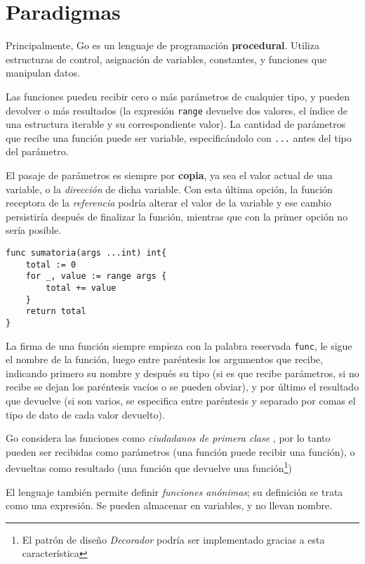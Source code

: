 \section{Paradigmas}

Principalmente, Go es un lenguaje de programación \textbf{procedural}. Utiliza estructuras de control, asignación de variables, constantes, y funciones que manipulan datos.

Las funciones pueden recibir cero o más parámetros de cualquier tipo, y pueden devolver o más resultados (la expresión \texttt{range} devuelve dos valores, el índice de una estructura iterable y su correspondiente valor). La cantidad de parámetros que recibe una función puede ser variable, especificándolo con \texttt{...} antes del tipo del parámetro.

El pasaje de parámetros es siempre por \textbf{copia}, ya sea el valor actual de una variable, o la \emph{dirección} de dicha variable. Con esta última opción, la función receptora de la \emph{referencia} podría alterar el valor de la variable y ese cambio persistiría después de finalizar la función, mientras que con la primer opción no sería posible.  

\vspace*{5mm}
\begin{lstlisting}[title=Función con cantidad variable de argumentos]
func sumatoria(args ...int) int{
    total := 0
    for _, value := range args {
        total += value
    }
    return total
}
\end{lstlisting}

La firma de una función siempre empieza con la palabra reservada \texttt{func}, le sigue el nombre de la función, luego entre paréntesis los argumentos que recibe, indicando primero su nombre y después su tipo (si es que recibe parámetros, si no recibe se dejan los paréntesis vacíos o se pueden obviar), y por último el resultado que devuelve (si son varios, se especifica entre paréntesis y separado por comas el tipo de dato de cada valor devuelto). 

Go considera las funciones como \emph{ciudadanos de primera clase} \autocite{Wikipedia:first-class-citizen}, por lo tanto pueden ser recibidas como parámetros (una función puede recibir una función), o devueltas como resultado (una función que devuelve una función\footnote{El patrón de diseño \emph{Decorador} podría ser implementado gracias a esta característica}) 

El lenguaje también permite definir \emph{funciones anónimas}; su definición se trata como una expresión. Se pueden almacenar en variables, y no llevan nombre. 

